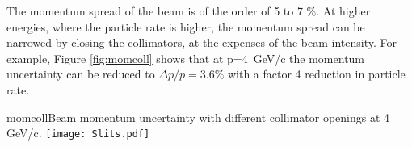 The momentum spread of the beam is of the order of 5 to 7 \%. At higher energies, where
the particle rate is higher, the momentum spread  can be narrowed by
closing the collimators, at the expenses of the beam intensity.  For example, Figure \ref{fig:momcoll} shows
that at p=4~GeV/c the momentum uncertainty can be  reduced to $\Delta p/p= 3.6\%$ with a factor 4 reduction in particle rate.  
\begin{cdrfigure}{momcoll}{Beam momentum uncertainty with different collimator openings at 4 GeV/c.}
  \texttt{[image: Slits.pdf]}
\end{cdrfigure}

